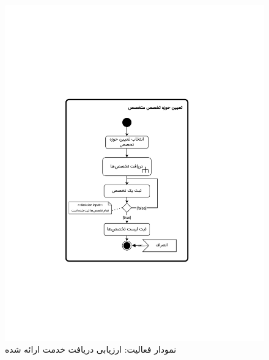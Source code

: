 \begin{figure}
	\centering
	\includegraphics[scale=0.8, page=7]{figs/OOD-activity21-30.pdf}
	\caption{نمودار فعالیت: ارزیابی دریافت خدمت ارائه شده}
\end{figure}
\FloatBarrier
\newpage

